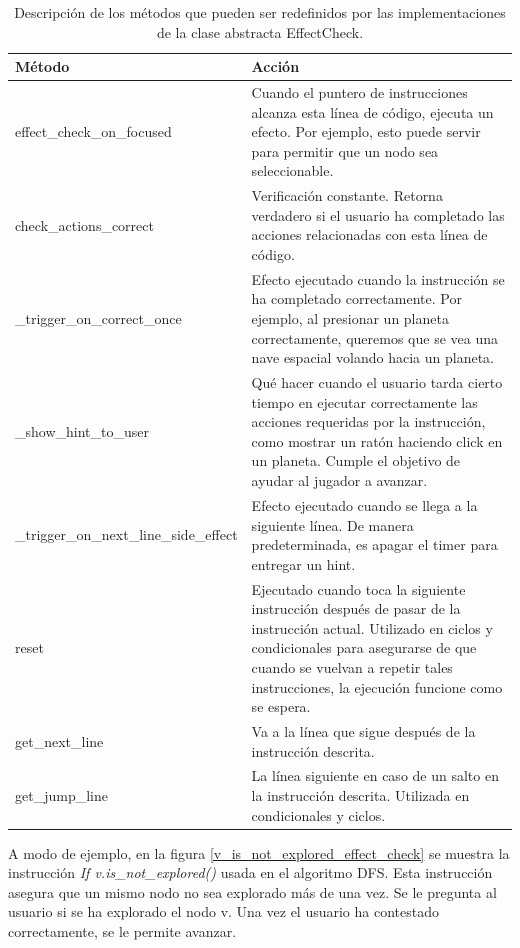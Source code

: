 \begin{table}[h]
    \centering
    \begin{tabular}{|l|p{}|}
        \hline
        \textbf{Método} & \textbf{Acción} \\
        \hline
        effect\_check\_on\_focused & Cuando el puntero de instrucciones alcanza esta línea de código, ejecuta un efecto. Por ejemplo, esto puede servir para permitir que un nodo sea seleccionable.\\
        \hline
        check\_actions\_correct & Verificación constante. Retorna verdadero si el usuario ha completado las acciones relacionadas con esta línea de código.  \\
        \hline
        \_trigger\_on\_correct\_once & Efecto ejecutado cuando la instrucción se ha completado correctamente. Por ejemplo, al presionar un planeta correctamente, queremos que se vea una nave espacial volando hacia un planeta. \\
        \hline
		\_show\_hint\_to\_user & Qué hacer cuando el usuario tarda cierto tiempo en ejecutar correctamente las acciones requeridas por la instrucción, como mostrar un ratón haciendo click en un planeta. Cumple el objetivo de ayudar al jugador a avanzar. \\
        \hline
        \_trigger\_on\_next\_line\_side\_effect & Efecto ejecutado cuando se llega a la siguiente línea. De manera predeterminada, es apagar el timer para entregar un hint.\\
        \hline
        reset & Ejecutado cuando toca la siguiente instrucción después de pasar de la instrucción actual. Utilizado en ciclos y condicionales para asegurarse de que cuando se vuelvan a repetir tales instrucciones, la ejecución funcione como se espera.  \\
        \hline
        get\_next\_line & Va a la línea que sigue después de la instrucción descrita. \\
        \hline
        get\_jump\_line & La línea siguiente en caso de un salto en la instrucción descrita. Utilizada en condicionales y ciclos. \\
        \hline
    \end{tabular}
    \caption{Descripción de los métodos que pueden ser redefinidos por las implementaciones de la clase abstracta EffectCheck.}
    \label{table_effect_check_methods}
\end{table}

\restoregeometry

A modo de ejemplo, en la figura \ref{v_is_not_explored_effect_check} se muestra la instrucción \emph{If v.is\_not\_explored()} usada en el algoritmo DFS. Esta instrucción asegura que un mismo nodo no sea explorado más de una vez. Se le pregunta al usuario si se ha explorado el nodo v. Una vez el usuario ha contestado correctamente, se le permite avanzar.

